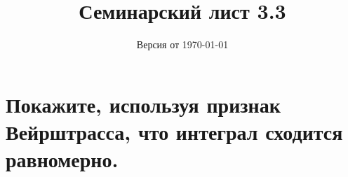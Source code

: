 \documentclass[a4paper, fleqn]{article}
\title{Семинарский лист 3.3}
\author{
}
\date{Версия от {\ddmmyyyydate\today} \currenttime}
\begin{document}
\maketitle












\section*{Покажите, используя признак Вейрштрасса, что интеграл сходится равномерно.}
\end{document}
